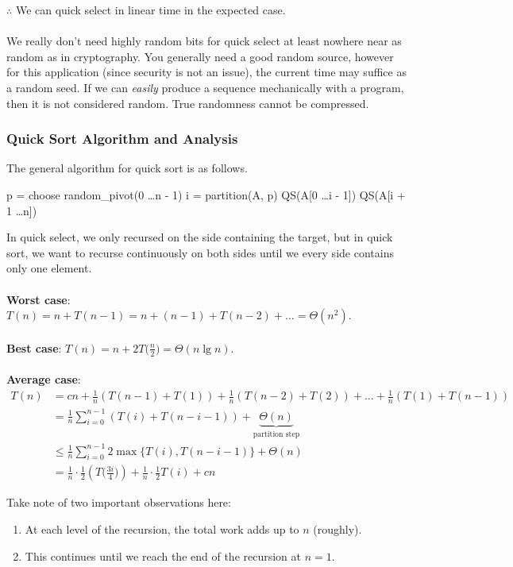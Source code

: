 \documentclass[]{article}
\theoremstyle{definition}
\begin{document}
				$\therefore$ We can quick select in linear time in the expected case.
				\\ \\
				We really don't need highly random bits for quick select \textendash{} at least nowhere near as random as in cryptography. You generally need a good random source, however for this application (since security is not an issue), the current time may suffice as a random seed. If we can \emph{easily} produce a sequence mechanically with a program, then it is not considered random. True randomness cannot be compressed.
			\subsubsection{Quick Sort Algorithm and Analysis}
				The general algorithm for quick sort is as follows. \\
				\begin{algorithm}[H]
					\;
					p = choose random\_pivot(0 \ldots n - 1)\;
					i = partition(A, p)\;
					QS(A[0 \ldots i - 1])\;
					QS(A[i + 1 \ldots n])\;
				\end{algorithm}

				In quick select, we only recursed on the side containing the target, but in quick sort, we want to recurse continuously on both sides until we every side contains only one element.
				\\ \\
				\textbf{Worst case}: $T(n) = n + T(n - 1) = n + (n - 1) + T(n - 2) + \ldots = \Theta(n^2)$.
				\\ \\
				\textbf{Best case}: $T(n) = n + 2T\big(\frac{n}{2}\big) = \Theta(n \lg n)$.
				\\ \\
				\textbf{Average case}:
				\begin{align*}
					T(n) &= cn + \frac{1}{n}(T(n - 1) + T(1)) + \frac{1}{n}(T(n - 2) + T(2)) + \ldots + \frac{1}{n}(T(1) + T(n - 1)) \\
					&= \frac{1}{n} \sum_{i = 0}^{n - 1}(T(i) + T(n - i - 1)) + \underbrace{\Theta(n)}_{\text{partition step}} \\
					&\le \frac{1}{n} \sum_{i = 0}^{n - 1} 2 \max \{T(i), T(n - i - 1) \} + \Theta(n) \\
					&= \frac{1}{n} \cdot \frac{1}{2}(T\big(\frac{3i}{4}\big)) + \frac{1}{n} \cdot \frac{1}{2} T(i) + cn
				\end{align*}

				Take note of two important observations here:
				\begin{enumerate}
					\item At each level of the recursion, the total work adds up to $n$ (roughly).
					\item This continues until we reach the end of the recursion at $n = 1$.
				\end{enumerate}
\end{document}
